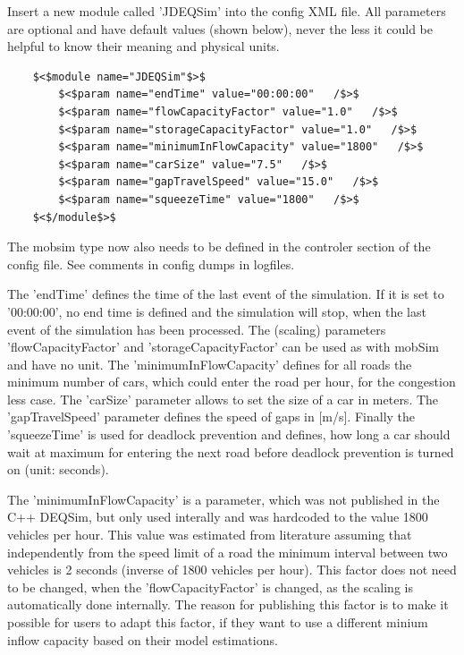 Insert  a new module called 'JDEQSim' into the config XML file. All parameters  are optional and have default values (shown below), never the less it  could be helpful to know their meaning and physical units.
\begin{verbatim}
	$<$module name="JDEQSim"$>$
		$<$param name="endTime" value="00:00:00"   /$>$
		$<$param name="flowCapacityFactor" value="1.0"   /$>$
		$<$param name="storageCapacityFactor" value="1.0"   /$>$
		$<$param name="minimumInFlowCapacity" value="1800"   /$>$
		$<$param name="carSize" value="7.5"   /$>$
		$<$param name="gapTravelSpeed" value="15.0"   /$>$
		$<$param name="squeezeTime" value="1800"   /$>$
	$<$/module$>$
\end{verbatim}The mobsim type now  also needs to be defined in the controler section of the config  file. See comments in config dumps in logfiles.

The  'endTime' defines the time of the last event of the simulation. If it is  set to '00:00:00', no end time is defined and the simulation will stop,  when the last event of the simulation has been processed. The (scaling)  parameters  'flowCapacityFactor' and 'storageCapacityFactor' can  be used as with mobSim and have no unit. The 'minimumInFlowCapacity'  defines for all roads the minimum number of cars, which could enter the  road per hour, for the congestion less case. The 'carSize' parameter  allows to set the size of a car in meters. The 'gapTravelSpeed'  parameter defines the speed of gaps in [m/s]. Finally the 'squeezeTime'  is used for deadlock prevention and defines, how long a car should wait  at maximum for entering the next road before deadlock prevention is  turned on (unit: seconds).

The 'minimumInFlowCapacity' is a  parameter, which was not published in the C++ DEQSim, but only used  interally and was hardcoded to the value 1800 vehicles per hour. This  value was estimated from literature assuming that independently from the  speed limit of a road the minimum interval between two vehicles is 2  seconds (inverse of 1800 vehicles per hour). This factor does not need  to be changed, when the 'flowCapacityFactor' is changed, as the scaling  is automatically done internally. The reason for publishing this factor  is to make it possible for users to adapt this factor, if they want to  use a different minium inflow capacity based on their model estimations.

